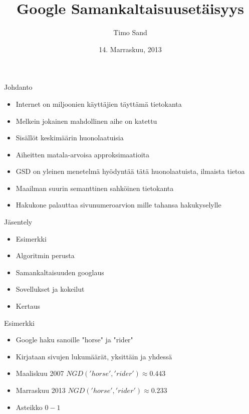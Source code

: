 \documentclass{beamer}
\title[Google Similarity Distance]{Google Samankaltaisuusetäisyys}
\author[T. Sand]{Timo Sand}
\institute[UH]{
  Tietojenkäsittelytieteen laitos\\
  Helsingin Yliopisto\\
  Helsinki\\[1ex]
}
\date[November 2013]{14. Marraskuu, 2013}
\begin{document}
\begin{frame}[plain]
  \titlepage
\end{frame}

\begin{frame}{Johdanto}
  \begin{itemize}
    \item Internet on miljoonien käyttäjien täyttämä tietokanta
    \item Melkein jokainen mahdollinen aihe on katettu
    \item Sisällöt keskimäärin huonolaatuisia
    \item Aiheitten matala-arvoisa approksimaatioita
  \end{itemize}

  \begin{itemize}
    \item GSD on yleinen menetelmä hyödyntää tätä huonolaatuista, ilmaista tietoa
    \item Maailman suurin semanttinen sahköinen tietokanta
    \item Hakukone palauttaa sivunumeroarvion mille tahansa hakukyselylle
  \end{itemize}

\end{frame}

\begin{frame}{Jäsentely}

\begin{itemize}
  \item Esimerkki
  \item Algoritmin perusta
  \item Samankaltaisuuden googlaus
  \item Sovellukset ja kokeilut
  \item Kertaus
\end{itemize}

\end{frame}

\begin{frame}{Esimerkki}

  \begin{itemize}
    \item Google haku sanoille "horse" ja "rider"
    \item Kirjataan sivujen lukumäärät, yksittäin ja yhdessä
    \item Maaliskuu 2007 $NGD('horse', 'rider') \approx 0.443$
    \item Marraskuu 2013 $NGD('horse', 'rider') \approx 0.233$
    \item Asteikko $0-1$
  \end{itemize}
\end{frame}
\end{document}
